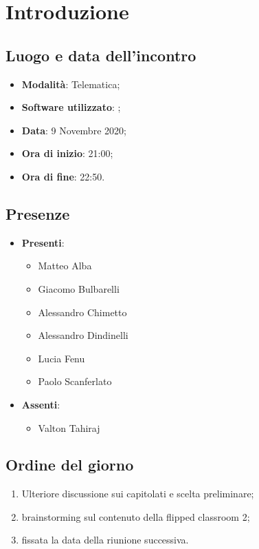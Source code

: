 \documentclass[]{article}
\begin{document}
	
	
	
	\newpage


	\section{Introduzione}
		\subsection{Luogo e data dell'incontro}
		\begin{itemize}
			\item \textbf{Modalità}: Telematica;
			\item \textbf{Software utilizzato}: ;
			\item \textbf{Data}: 9 Novembre 2020;
			\item \textbf{Ora di inizio}: 21:00;
			\item \textbf{Ora di fine}: 22:50.
		\end{itemize}
		
		\subsection{Presenze}
		\begin{itemize}
			\item \textbf{Presenti}: 
			\begin{itemize}
				\item Matteo Alba
				\item Giacomo Bulbarelli
				\item Alessandro Chimetto
				\item Alessandro Dindinelli
				\item Lucia Fenu
				\item Paolo Scanferlato
			\end{itemize}
			\item \textbf{Assenti}: 
			\begin{itemize}
				\item Valton Tahiraj
			\end{itemize}
		\end{itemize}
		
		
		\subsection{Ordine del giorno}
		\begin{enumerate}
			\item Ulteriore discussione sui capitolati e scelta preliminare;
			\item brainstorming sul contenuto della flipped classroom 2;
			\item fissata la data della riunione successiva.
		\end{enumerate}
\end{document}
